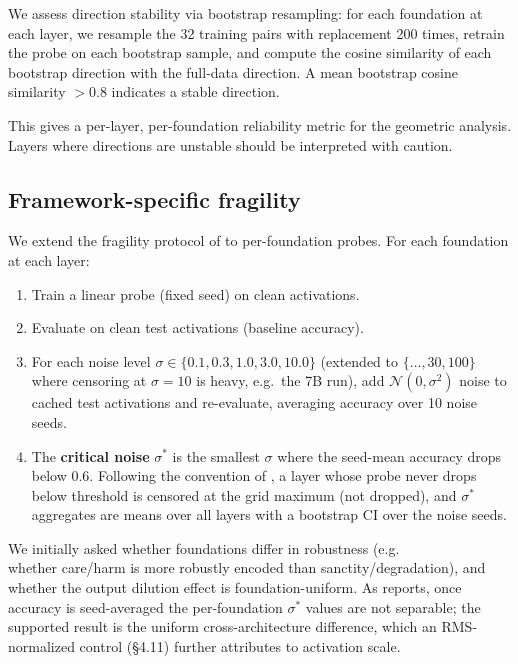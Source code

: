 We assess direction stability via bootstrap resampling: for each
foundation at each layer, we resample the 32 training pairs with
replacement 200 times, retrain the probe on each bootstrap sample,
and compute the cosine similarity of each bootstrap direction with
the full-data direction. A mean bootstrap cosine similarity \(> 0.8\)
indicates a stable direction.

This gives a per-layer, per-foundation reliability metric for the
geometric analysis. Layers where directions are unstable should be
interpreted with caution.

\subsection{Framework-specific fragility}\label{framework-specific-fragility}

We extend the fragility protocol of
\citet{reblitzrichardson2026fragility} to per-foundation probes.
For each foundation at each layer:

\begin{enumerate}
\def\labelenumi{\arabic{enumi}.}
\tightlist
\item
  Train a linear probe (fixed seed) on clean activations.
\item
  Evaluate on clean test activations (baseline accuracy).
\item
  For each noise level \(\sigma \in \{0.1, 0.3, 1.0, 3.0, 10.0\}\)
  (extended to \(\{\ldots, 30, 100\}\) where censoring at \(\sigma=10\) is
  heavy, e.g.~the 7B run), add \(\mathcal{N}(0, \sigma^2)\) noise to
  cached test activations and re-evaluate, averaging accuracy over 10
  noise seeds.
\item
  The \textbf{critical noise} \(\sigma^*\) is the smallest \(\sigma\) where the
  seed-mean accuracy drops below 0.6. Following the convention of
  \citet{reblitzrichardson2026fragility}, a layer whose probe never
  drops below threshold is censored at the grid maximum (not dropped),
  and \(\sigma^*\) aggregates are means over all layers with a bootstrap
  CI over the noise seeds.
\end{enumerate}

We initially asked whether foundations differ in robustness (e.g.\\
whether care/harm is more robustly encoded than sanctity/degradation),
and whether the output dilution effect
\citep{reblitzrichardson2026dilution} is foundation-uniform. As 
reports, once accuracy is seed-averaged the per-foundation \(\sigma^*\)
values are not separable; the supported result is the uniform
cross-architecture difference, which an RMS-normalized control (\S4.11)
further attributes to activation scale.

